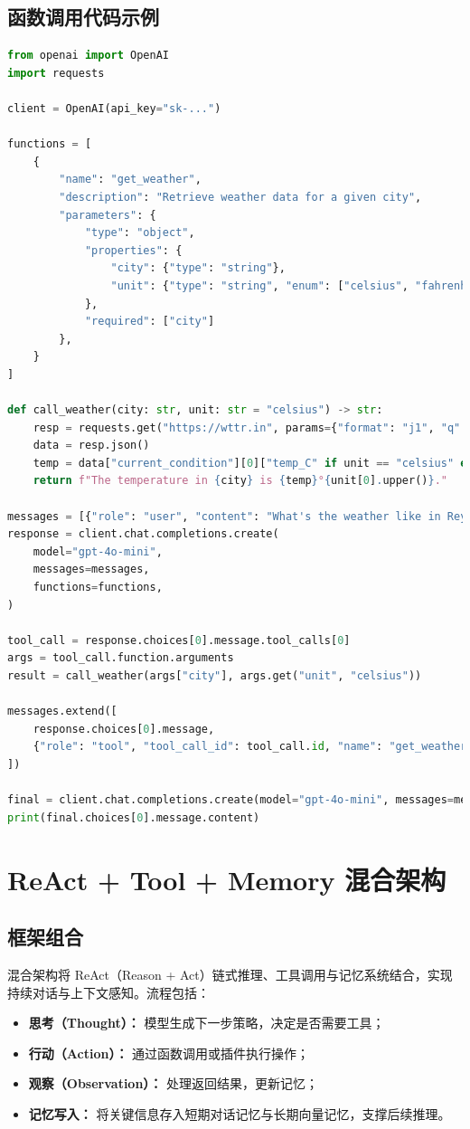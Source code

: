 \documentclass[UTF8,zihao=-4]{ctexart}
\begin{document}
\subsection{函数调用代码示例}
\begin{lstlisting}[language=Python,caption={OpenAI 函数调用示例：调用天气 API}]
from openai import OpenAI
import requests

client = OpenAI(api_key="sk-...")

functions = [
    {
        "name": "get_weather",
        "description": "Retrieve weather data for a given city",
        "parameters": {
            "type": "object",
            "properties": {
                "city": {"type": "string"},
                "unit": {"type": "string", "enum": ["celsius", "fahrenheit"]}
            },
            "required": ["city"]
        },
    }
]

def call_weather(city: str, unit: str = "celsius") -> str:
    resp = requests.get("https://wttr.in", params={"format": "j1", "q": city})
    data = resp.json()
    temp = data["current_condition"][0]["temp_C" if unit == "celsius" else "temp_F"]
    return f"The temperature in {city} is {temp}°{unit[0].upper()}."

messages = [{"role": "user", "content": "What's the weather like in Reykjavik?"}]
response = client.chat.completions.create(
    model="gpt-4o-mini",
    messages=messages,
    functions=functions,
)

tool_call = response.choices[0].message.tool_calls[0]
args = tool_call.function.arguments
result = call_weather(args["city"], args.get("unit", "celsius"))

messages.extend([
    response.choices[0].message,
    {"role": "tool", "tool_call_id": tool_call.id, "name": "get_weather", "content": result},
])

final = client.chat.completions.create(model="gpt-4o-mini", messages=messages)
print(final.choices[0].message.content)
\end{lstlisting}

\section{ReAct + Tool + Memory 混合架构}
\subsection{框架组合}
混合架构将 ReAct（Reason + Act）链式推理、工具调用与记忆系统结合，实现持续对话与上下文感知。流程包括：
\begin{itemize}
  \item \textbf{思考（Thought）：} 模型生成下一步策略，决定是否需要工具；
  \item \textbf{行动（Action）：} 通过函数调用或插件执行操作；
  \item \textbf{观察（Observation）：} 处理返回结果，更新记忆；
  \item \textbf{记忆写入：} 将关键信息存入短期对话记忆与长期向量记忆，支撑后续推理。
\end{itemize}
\end{document}
